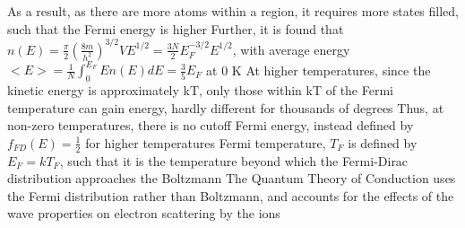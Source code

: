 \documentclass[11 pt, twoside]{article}
\newenvironment{outline*}
{
	\begin{outline}[enumerate]
	}
	{\end{outline}
}
\begin{document}
\begin{outline*}
		\3 As a result, as there are more atoms within a region, it requires more states filled, such that the Fermi energy is higher
		\3 Further, it is found that $n(E) = \frac{\pi}{2}(\frac{8m}{h^2})^{3/2}VE^{1/2} = \frac{3N}{2}E_F^{-3/2}E^{1/2}$, with average energy $<E> = \frac{1}{N}\int^{E_F}_0 En(E)dE = \frac{3}{5}E_F$ at 0 K
			\4 At higher temperatures, since the kinetic energy is approximately kT, only those within kT of the Fermi temperature can gain energy, hardly different for thousands of degrees
			\4 Thus, at non-zero temperatures, there is no cutoff Fermi energy, instead defined by $f_{FD}(E) = \frac{1}{2}$ for higher temperatures
	\2 Fermi temperature, $T_F$ is defined by $E_F = kT_F$, such that it is the temperature beyond which the Fermi-Dirac distribution approaches the Boltzmann
\1 The Quantum Theory of Conduction uses the Fermi distribution rather than Boltzmann, and accounts for the effects of the wave properties on electron scattering by the ions
	\2 
\end{outline*}
\end{document}
